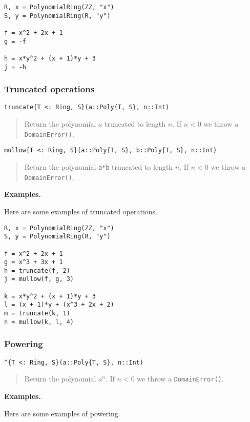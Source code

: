 \documentclass[a4paper,10pt]{article}
\newcommand{\code}{\lstinline}
\newcommand{\desc}[1]{\vspace{-3mm}\begin{quote}#1\end{quote}}
\begin{document}
{{{\begin{lstlisting}
R, x = PolynomialRing(ZZ, "x")
S, y = PolynomialRing(R, "y")

f = x^2 + 2x + 1
g = -f

h = x*y^2 + (x + 1)*y + 3
j = -h
\end{lstlisting}

\subsubsection{Truncated operations}

\begin{lstlisting}
truncate{T <: Ring, S}(a::Poly{T, S}, n::Int)
\end{lstlisting}

\desc{Return the polynomial $a$ truncated to length $n$. If $n < 0$ we throw a
\code{DomainError()}.}

\begin{lstlisting}
mullow{T <: Ring, S}(a::Poly{T, S}, b::Poly{T, S}, n::Int)
\end{lstlisting}

\desc{Return the polynomial \code{a*b} truncated to length $n$. If $n < 0$ we
throw a \code{DomainError()}.}

\textbf{Examples.}

Here are some examples of truncated operations.

\begin{lstlisting}
R, x = PolynomialRing(ZZ, "x")
S, y = PolynomialRing(R, "y")

f = x^2 + 2x + 1
g = x^3 + 3x + 1
h = truncate(f, 2)
j = mullow(f, g, 3)

k = x*y^2 + (x + 1)*y + 3
l = (x + 1)*y + (x^3 + 2x + 2)
m = truncate(k, 1)
n = mullow(k, l, 4)
\end{lstlisting}

\subsubsection{Powering}

\begin{lstlisting}
^{T <: Ring, S}(a::Poly{T, S}, n::Int)
\end{lstlisting}

\desc{Return the polynomial $a^n$. If $n < 0$ we throw a \code{DomainError()}.}

\textbf{Examples.}

Here are some examples of powering.

}}}
\end{document}
